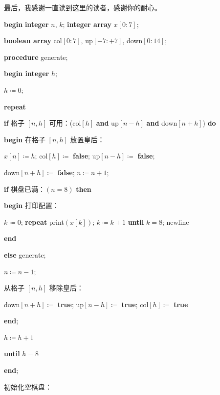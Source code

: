 \documentclass[twoside,11pt,fontset=none]{ctexbook}
\begin{document}
最后，我感谢一直读到这里的读者，感谢你的耐心。
\bigskip

\noindent
\textbf{begin} \textbf{integer} $n$, $k$; \textbf{integer array} $x[0:7]$;

\noindent
\quad \quad \textbf{boolean array} col$[0:7]$, up$[-7:+7]$, down$[0:14]$;

\noindent
\quad \textbf{procedure} generate;

\noindent
\quad \textbf{begin integer} $h$;

\noindent
\quad \quad $h \coloneq 0$;

\noindent
\quad \quad \textbf{repeat}

\noindent
\quad \quad \quad \textbf{if} 格子 $[n,h]$ 可用：(col$[h]$ \textbf{and} up$[n-h]$ \textbf{and} down$[n+h]$) \textbf{do}

\noindent
\quad \quad \quad \textbf{begin} 在格子 $[n,h]$ 放置皇后：

\noindent
\quad \quad \quad \quad \quad $x[n] \coloneq h$; col$[h]\coloneq$ \textbf{false}; up$[n-h]\coloneq$ \textbf{false};

\noindent
\quad \quad \quad \quad \quad down$[n+h]\coloneq$ \textbf{false}; $n\coloneq n + 1$;

\noindent
\quad \quad \quad \quad \textbf{if} 棋盘已满：$(n = 8)$ \textbf{then}

\noindent
\quad \quad \quad \quad \textbf{begin} 打印配置：

\noindent
\quad \quad \quad \quad \quad $k\coloneq 0$; \textbf{repeat} print$(x[k])$; $k\coloneq k + 1$ \textbf{until} $k = 8$; newline


\noindent
\quad \quad \quad \quad \textbf{end}

\noindent
\quad \quad \quad \textbf{else} generate;

\noindent
\quad \quad \quad \quad $n \coloneq n - 1;$

\noindent
\quad \quad \quad \quad 从格子 $[n,h]$ 移除皇后：

\noindent
\quad \quad \quad \quad \quad down$[n+h]\coloneq$ \textbf{true}; up$[n-h] \coloneq$ \textbf{true}; col$[h]\coloneq$ \textbf{true}

\noindent
\quad \quad \quad \textbf{end};

\noindent
\quad \quad \quad $h\coloneq h + 1$

\noindent
\quad \quad \textbf{until} $h = 8$

\noindent
\quad \textbf{end};

\noindent
\quad 初始化空棋盘：
\end{document}
